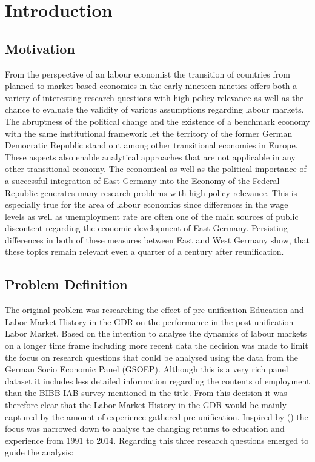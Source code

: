 \section{Introduction} \label{Sec:Intro}
\subsection{Motivation}
From the perspective of an labour economist the transition of countries from planned to market based economies in the early nineteen-nineties offers both a variety of interesting research questions with high policy relevance as well as the chance to evaluate the validity of various assumptions regarding labour markets.
The abruptness of the political change and the existence of a benchmark economy with the same institutional framework let the territory of the former German Democratic Republic stand out among other transitional economies in Europe. These aspects also enable analytical approaches that are not applicable in any other transitional economy.
The economical as well as the political importance of a successful integration of East Germany into the Economy of the Federal Republic generates many research problems with high policy relevance. This is especially true for the area of labour economics since differences in the wage levels as well as unemployment rate are often one of the main sources of public discontent regarding the economic development of East Germany. Persisting differences in both of these measures between East and West Germany show, that these topics remain relevant even a quarter of a century after reunification.  
\subsection{Problem Definition}
The original problem was researching the effect of pre-unification Education and Labor Market History in the GDR on the performance in the post-unification Labor Market. Based on the intention to analyse the dynamics of labour markets on a longer time frame including more recent data the decision was made to limit the focus on research questions that could be analysed using the data from the German Socio Economic Panel (GSOEP). Although this is a very rich panel dataset it includes less detailed information regarding the contents of employment than the BIBB-IAB survey mentioned in the title. From this decision it was therefore clear that the Labor Market History in the GDR would be mainly captured by the amount of experience gathered pre unification. Inspired by (\cite{gathmann_understanding_2004}) the focus was narrowed down to analyse the changing returns to education and experience from 1991 to 2014. Regarding this three research questions emerged to guide the analysis:

